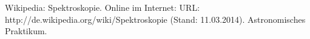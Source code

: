 \begin{thebibliography}{9}
 Wikipedia: Spektroskopie. Online im Internet: URL: http://de.wikipedia.org/wiki/Spektroskopie (Stand: 11.03.2014). 
 Astronomisches Praktikum.
\end{thebibliography}
